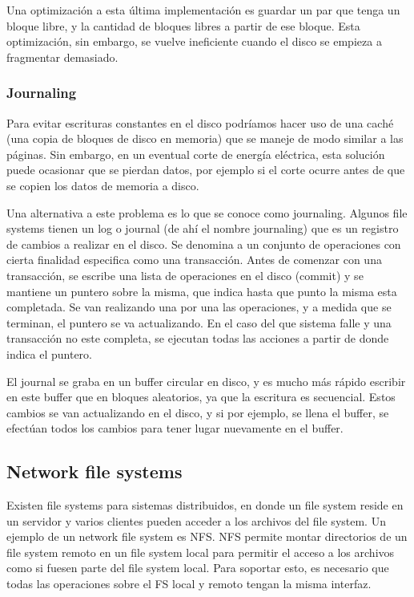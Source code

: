 \documentclass{article}
\begin{document}
Una optimizaci\'on a esta \'ultima implementaci\'on es guardar un par que tenga un bloque libre, y la cantidad de bloques libres a partir de ese bloque. Esta optimizaci\'on, sin embargo, se vuelve ineficiente cuando el disco se empieza a fragmentar demasiado.

\subsubsection{Journaling}

Para evitar escrituras constantes en el disco podríamos hacer uso de una cach\'e (una copia de bloques de disco en memoria) que se maneje de modo similar a las p\'aginas. Sin embargo, en un eventual corte de energ\'ia el\'ectrica, esta solución puede ocasionar que se pierdan datos, por ejemplo si el corte ocurre antes de que se copien los datos de memoria a disco.

Una alternativa a este problema es lo que se conoce como journaling. Algunos file systems tienen un log o journal (de ah\'i el nombre journaling) que es un registro de cambios a realizar en el disco. Se denomina a un conjunto de operaciones con cierta finalidad especifica como una transacción. Antes de comenzar con una transacción, se escribe una lista de operaciones en el disco (commit) y se mantiene un puntero sobre la misma, que indica hasta que punto la misma esta completada. Se van realizando una por una las operaciones, y a medida que se terminan, el puntero se va actualizando. En el caso del que sistema falle y una transacción no este completa, se ejecutan todas las acciones a partir de donde indica el puntero.

El journal se graba en un buffer circular en disco, y es mucho m\'as r\'apido escribir en este buffer que en bloques aleatorios, ya que la escritura es secuencial. Estos cambios se van actualizando en el disco, y si por ejemplo, se llena el buffer, se efectúan todos los cambios para tener lugar nuevamente en el buffer.

\subsection{Network file systems}

Existen file systems para sistemas distribuidos, en donde un file system reside en un servidor y varios clientes pueden acceder a los archivos del file system. Un ejemplo de un network file system es NFS. NFS permite montar directorios de un file system remoto en un file system local para permitir el acceso a los archivos como si fuesen parte del file system local. Para soportar esto, es necesario que todas las operaciones sobre el FS local y remoto tengan la misma interfaz.
\end{document}
